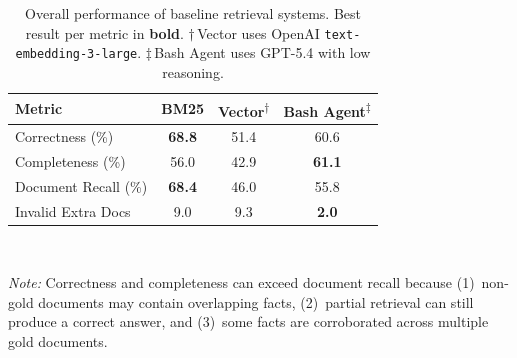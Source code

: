 \documentclass{article}
\begin{document}
\begin{table}[t]
  \caption{Overall performance of baseline retrieval systems. Best result per metric in \textbf{bold}. $\dagger$\,Vector uses OpenAI \texttt{text-embedding-3-large}. $\ddagger$\,Bash Agent uses GPT-5.4 with low reasoning.}
  \label{tab:overall_results}
  \centering
  \begin{tabular}{lccc}
    \toprule
    Metric & BM25 & Vector{\small\textsuperscript{$\dagger$}} & Bash Agent{\small\textsuperscript{$\ddagger$}} \\
    \midrule
    Correctness (\%)       & \textbf{68.8} & 51.4 & 60.6 \\
    Completeness (\%)      & 56.0          & 42.9 & \textbf{61.1} \\
    Document Recall (\%)   & \textbf{68.4} & 46.0 & 55.8 \\
    Invalid Extra Docs     & 9.0           & 9.3  & \textbf{2.0} \\
    \bottomrule
  \end{tabular}
  \\[0.5em]
  \parbox{\textwidth}{\footnotesize \textit{Note:} Correctness and completeness can exceed document recall because (1)~non-gold documents may contain overlapping facts, (2)~partial retrieval can still produce a correct answer, and (3)~some facts are corroborated across multiple gold documents.}
\end{table}
\end{document}

